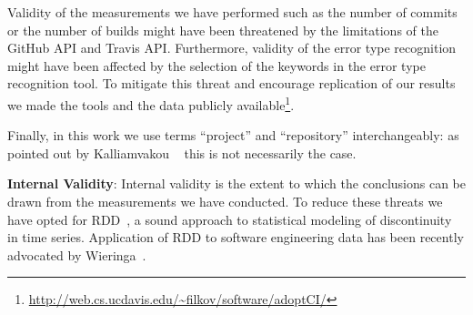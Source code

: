 Validity of the measurements we have performed such as the number of commits or the number of builds might have been threatened by the limitations of the GitHub API and Travis API.
Furthermore, validity of the error type recognition might have been affected by the selection of the keywords in the error type recognition tool. 
To mitigate this threat and encourage replication of our results we made the tools and the data publicly available\footnote{\url{http://web.cs.ucdavis.edu/~filkov/software/adoptCI/}}.

Finally, in this work we use terms ``project'' and ``repository'' interchangeably: as pointed out by Kalliamvakou \etal~\cite{Kalliamvakou2014Promises} this is not necessarily the case. 


\textbf{Internal Validity}:
Internal validity is the extent to which the conclusions can be drawn from the measurements we have conducted. 
To reduce these threats we have opted for RDD~\cite{imbens2008regression}, a sound approach to statistical modeling of discontinuity in time series. 
Application of RDD to software engineering data has been recently advocated by Wieringa~\cite{Wieringa}.

 
